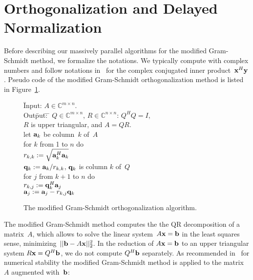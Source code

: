 \documentclass{article}
\newcommand\x{{\bf x}}
\newcommand\y{{\bf y}}
\newcommand\bfa{{\bf a}}
\newcommand\bfb{{\bf b}}
\newcommand\bfq{{\bf q}}
\newcommand\cc{{\mathbb C}}
\begin{document}
\section{Orthogonalization and Delayed Normalization}

Before describing our massively parallel algorithms for the
modified Gram-Schmidt method, we formalize the notations.
We typically compute with complex numbers and follow notations
in~\cite{GV96} for the complex conjugated inner product~$\x^H \y$.
Pseudo code of the modified Gram-Schmidt orthogonalization method
is listed in Figure~\ref{figalgmgs}.
\begin{figure}[hbt]
\begin{center}
\begin{tabbing}
\hspace{8mm} \= Input: $A \in \cc^{m \times n}$. \\
\> Out\=put\=: \= $Q \in \cc^{m \times n}$, $R \in \cc^{n \times n}$: 
                  $Q^H Q = I$, \\
\>    \>   \>  \> $R$ is upper triangular, and $A = QR$. \\
\> let ${\bfa}_k$ be column~$k$ of~$A$ \\
\> for $k$ from 1 to $n$ do \\
\>    \> $r_{k, k} := \sqrt{ \bfa_k^H \bfa_k }$ \\
\>    \> $\bfq_k := \bfa_k/r_{k, k}$, $\bfq_k$ is column $k$ of~$Q$ \\
\>    \> for $j$ from $k+1$ to $n$ do \\
\>    \>   \> $r_{k, j} := \bfq_k^H \bfa_j$ \\
\>    \>   \> $\bfa_j := \bfa_j - r_{k, j} \bfq_k$
\end{tabbing}
\caption{The modified Gram-Schmidt orthogonalization algorithm.}
\label{figalgmgs}
\end{center}
\end{figure}

The modified Gram-Schmidt method computes the 
the QR decomposition of a matrix~$A$,
which allows to solve the linear system~$A \x = \bfb$
in the least squares sense, minimizing~$|| \bfb - A \x ||_2^2$.
In the reduction of $A \x = \bfb$ to an upper triangular system
$R \x = Q^H \bfb$, we do not compute $Q^H \bfb$ separately.
As recommended in~\cite[\S 19.3]{Hig96} for numerical stability 
the modified Gram-Schmidt method is applied to the matrix~$A$
augmented with~$\bfb$:
\end{document}
